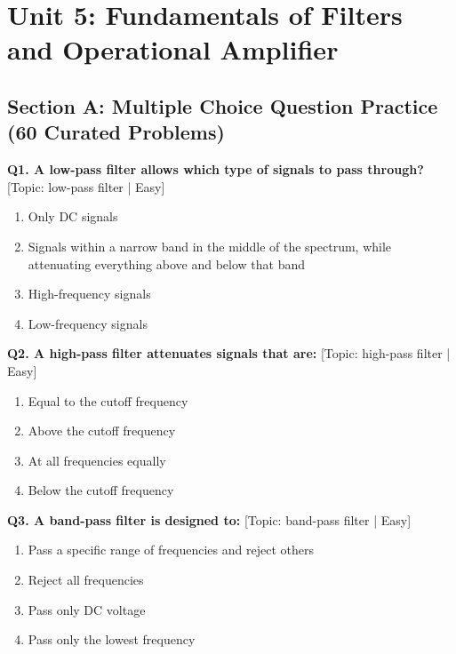 \chapter{Unit 5: Fundamentals of Filters and Operational Amplifier}

\section{Section A: Multiple Choice Question Practice (60 Curated Problems)}

\noindent\textbf{Q1. A low-pass filter allows which type of signals to pass through?} \hfill [Topic: low-pass filter | Easy]
\begin{enumerate}[label=(\alph*),topsep=2pt,itemsep=1pt,partopsep=0pt,parsep=0pt]
    \item {Only DC signals}
    \item {Signals within a narrow band in the middle of the spectrum, while attenuating everything above and below that band}
    \item {High-frequency signals}
    \item {Low-frequency signals}
\end{enumerate}
\vspace{2mm}

\noindent\textbf{Q2. A high-pass filter attenuates signals that are:} \hfill [Topic: high-pass filter | Easy]
\begin{enumerate}[label=(\alph*),topsep=2pt,itemsep=1pt,partopsep=0pt,parsep=0pt]
    \item {Equal to the cutoff frequency}
    \item {Above the cutoff frequency}
    \item {At all frequencies equally}
    \item {Below the cutoff frequency}
\end{enumerate}
\vspace{2mm}

\noindent\textbf{Q3. A band-pass filter is designed to:} \hfill [Topic: band-pass filter | Easy]
\begin{enumerate}[label=(\alph*),topsep=2pt,itemsep=1pt,partopsep=0pt,parsep=0pt]
    \item {Pass a specific range of frequencies and reject others}
    \item {Reject all frequencies}
    \item {Pass only DC voltage}
    \item {Pass only the lowest frequency}
\end{enumerate}
\vspace{2mm}

